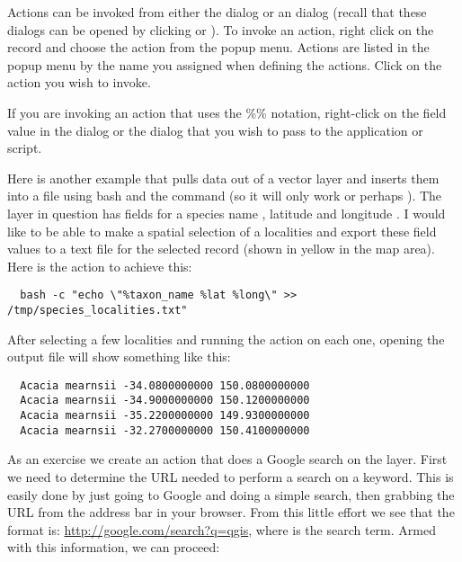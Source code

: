 Actions can be invoked from either the  dialog or an
 dialog (recall that these dialogs can be opened by
clicking  or
). To invoke an action,
right click on the record and choose the action from the popup menu. Actions
are listed in the popup menu by the name you assigned when defining the
actions. Click on the action you wish to invoke.

If you are invoking an action that uses the \%\% notation, right-click on the
field value in the  dialog or the
 dialog that you wish to pass to the application or script.

Here is another example that pulls data out of a vector layer and inserts them
into a file using bash and the  command (so it will only work
\nix or perhaps \osx). The layer in question has fields for a species name
, latitude  and longitude
. I would like to be able to
make a spatial selection of a localities and export these field values to a
text file for the selected record (shown in yellow in the \qg map area). Here is
the action to achieve this:

\begin{verbatim}
  bash -c "echo \"%taxon_name %lat %long\" >> /tmp/species_localities.txt"
\end{verbatim}

After selecting a few localities and running the action on each one, opening
the output file will show something like this:

\begin{verbatim}
  Acacia mearnsii -34.0800000000 150.0800000000
  Acacia mearnsii -34.9000000000 150.1200000000
  Acacia mearnsii -35.2200000000 149.9300000000
  Acacia mearnsii -32.2700000000 150.4100000000
\end{verbatim}

As an exercise we create an action that does a Google search on the
 layer. First we need to determine the URL needed to perform a search on a
keyword. This is easily done by just going to Google and doing a simple
search, then grabbing the URL from the address bar in your browser. From this
little effort we see that the format is: \url{http://google.com/search?q=qgis},
where \usertext{\qg} is the search term. Armed with this information, we can
proceed:

